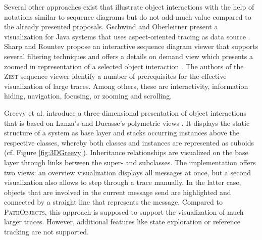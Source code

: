 Several other approaches exist that illustrate object interactions with the help of notations similar to sequence diagrams but do not add much value compared to the already presented proposals.
Gschwind and Oberleitner present a visualization for Java systems that uses aspect-oriented tracing as data source \cite{gschwind_improving_2003}.
Sharp and Rountev propose an interactive sequence diagram viewer that supports several filtering techniques and offers a details on demand view which presents a zoomed in representation of a selected object interaction \cite{sharp_interactive_2005}.
The authors of the \textsc{Zest} sequence viewer \cite{bennett_working_2007} identify a number of prerequisites for the effective visualization of large traces. Among others, these are interactivity, information hiding, navigation, focusing, or zooming and scrolling.

Greevy et al. introduce a three-dimensional presentation of object interactions \cite{greevy_visualizing_2006} that is based on Lanza's and Ducasse's polymetric views \cite{lanza_polymetric_2003}.
It displays the static structure of a system as base layer and stacks occurring instances above the respective classes, whereby both classes and instances are represented as cuboids (cf. Figure \ref{fig:3DGreevy}).
Inheritance relationships are visualized on the base layer through links between the super- and subclasses.
The implementation offers two views: an overview visualization displays all messages at once, but a second visualization also allows to step through a trace manually.
In the latter case, objects that are involved in the current message send are highlighted and connected by a straight line that represents the message.
Compared to \textsc{PathObjects}, this approach is supposed to support the visualization of much larger traces.
However, additional features like state exploration or reference tracking are not supported.

